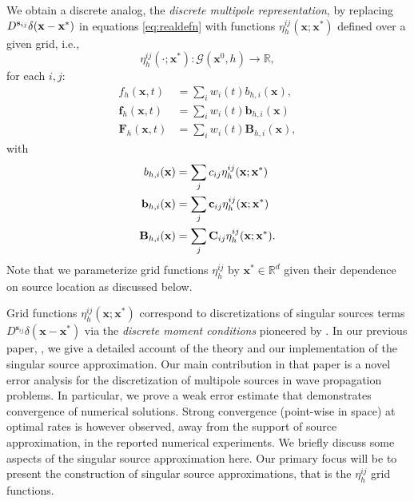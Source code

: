 We obtain a discrete analog, the {\em discrete multipole representation}, by replacing $D^{{\bf s}_{ij}}\delta({\bf x} - {\bf x}^*)$ in equations \ref{eq:realdefn} with functions $\eta_h^{ij}(\mathbf x;\mathbf x^*)$ defined over a given grid, i.e., 
\[
	\eta_{h}^{ij}(\cdot;\mathbf x^*) : \mathcal G(\mathbf x^0,h) \to \mathbb R,
\]
for each $i,j$:
\begin{equation}
\label{eq:MPSdiscrete}
\begin{split}
        f_h(\mathbf x,t) &= \sum_{i} w_i(t) b_{h,i}(\mathbf x),\\
        \mathbf f_h(\mathbf x,t) &= \sum_{i} w_i(t) \mathbf b_{h,i}(\mathbf x)\\
        \mathbf F_h(\mathbf x,t) &= \sum_{i} w_i(t) \mathbf B_{h,i}(\mathbf x),
\end{split}
\end{equation}
with
\begin{equation}
\label{eq:realdefndiscrete}
\begin{split}
	b_{h,i}(\mathbf x) & = \sum_j c_{ij} \eta_{h}^{ij}(\mathbf x;\mathbf x^*)  \\
	\mathbf b_{h,i}(\mathbf x) & = \sum_j {\bf c}_{ij} \eta_{h}^{ij}(\mathbf x;\mathbf x^*) \\
	\mathbf B_{h,i}(\mathbf x) & = \sum_j {\bf C}_{ij} \eta_{h}^{ij}(\mathbf x;\mathbf x^*).
\end{split}
\end{equation}
Note that we parameterize grid functions $\eta_h^{ij}$ by $\mathbf x^*\in\mathbb R^d$ given their dependence on source location as discussed below.

Grid functions $\eta_h^{ij}(\mathbf x;\mathbf x^*)$ correspond to discretizations of singular sources terms $D^{\mathbf s_{ij}}\delta(\mathbf x-\mathbf x^*)$ via the {\em discrete moment conditions} pioneered by \cite{Walden:1999}.
In our previous paper, \cite{MPS_theory}, we give a detailed account of the theory and our implementation of the singular source approximation.
Our main contribution in that paper is a novel error analysis for the discretization of multipole sources in wave propagation problems.
In particular, we prove a weak error estimate that demonstrates convergence of numerical solutions.
Strong convergence (point-wise in space) at optimal rates is however observed, away from the support of source approximation, in the reported numerical experiments.
We briefly discuss some aspects of the singular source approximation here.
Our primary focus will be to present the construction of singular source approximations, that is the $\eta_{h}^{ij}$ grid functions.

